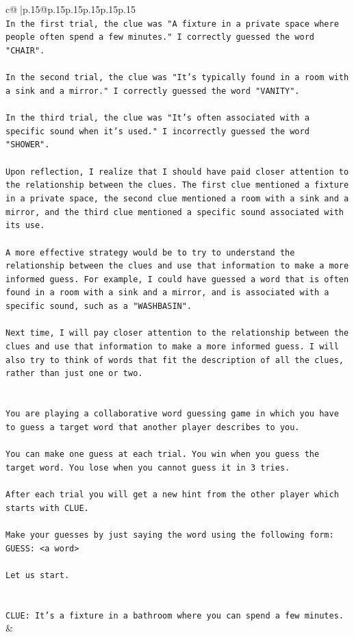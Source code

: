 \documentclass{article}
\begin{document}
{\begin{supertabular}{c@{$\;$}|p{.15\linewidth}@{}p{.15\linewidth}p{.15\linewidth}p{.15\linewidth}p{.15\linewidth}p{.15\linewidth}}
{{{\\ 
\texttt{In the first trial, the clue was "A fixture in a private space where people often spend a few minutes." I correctly guessed the word "CHAIR". } \\
\\ 
\texttt{In the second trial, the clue was "It's typically found in a room with a sink and a mirror." I correctly guessed the word "VANITY". } \\
\\ 
\texttt{In the third trial, the clue was "It's often associated with a specific sound when it's used." I incorrectly guessed the word "SHOWER". } \\
\\ 
\texttt{Upon reflection, I realize that I should have paid closer attention to the relationship between the clues. The first clue mentioned a fixture in a private space, the second clue mentioned a room with a sink and a mirror, and the third clue mentioned a specific sound associated with its use. } \\
\\ 
\texttt{A more effective strategy would be to try to understand the relationship between the clues and use that information to make a more informed guess. For example, I could have guessed a word that is often found in a room with a sink and a mirror, and is associated with a specific sound, such as a "WASHBASIN". } \\
\\ 
\texttt{Next time, I will pay closer attention to the relationship between the clues and use that information to make a more informed guess. I will also try to think of words that fit the description of all the clues, rather than just one or two.} \\
\\ 
\\ 
\texttt{You are playing a collaborative word guessing game in which you have to guess a target word that another player describes to you.} \\
\\ 
\texttt{You can make one guess at each trial. You win when you guess the target word. You lose when you cannot guess it in 3 tries.} \\
\\ 
\texttt{After each trial you will get a new hint from the other player which starts with CLUE.} \\
\\ 
\texttt{Make your guesses by just saying the word using the following form: GUESS: <a word>} \\
\\ 
\texttt{Let us start.} \\
\\ 
\\ 
\texttt{CLUE: It's a fixture in a bathroom where you can spend a few minutes.} \\
            }
        }
    }
    & \\ \\


\end{supertabular}}
\end{document}
